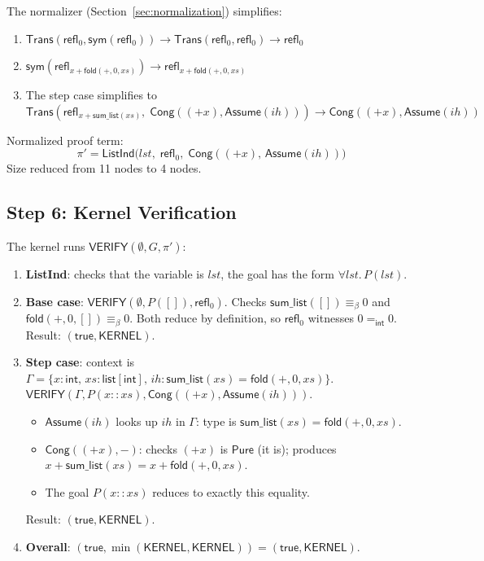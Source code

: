 \documentclass[11pt,a4paper]{report}
\theoremstyle{definition}
\theoremstyle{plain}
\newcommand{\Refl}{\mathsf{refl}}
\newcommand{\sym}{\mathsf{sym}}
\newcommand{\Assume}{\mathsf{Assume}}
\newcommand{\Trans}{\mathsf{Trans}}
\newcommand{\Cong}{\mathsf{Cong}}
\newcommand{\Pure}{\mathsf{Pure}}
\begin{document}
The normalizer (Section~\ref{sec:normalization}) simplifies:
\begin{enumerate}
  \item $\Trans(\Refl_0, \sym(\Refl_0)) \longrightarrow
         \Trans(\Refl_0, \Refl_0) \longrightarrow \Refl_0$
  \item $\sym(\Refl_{x + \mathsf{fold}(+,0,xs)}) \longrightarrow
         \Refl_{x + \mathsf{fold}(+,0,xs)}$
  \item The step case simplifies to
        $\Trans(\Refl_{x+\mathsf{sum\_list}(xs)},\;
         \Cong((+x), \Assume(\mathit{ih}))) \longrightarrow
         \Cong((+x), \Assume(\mathit{ih}))$
\end{enumerate}
Normalized proof term:
\[
  \pi' = \mathsf{ListInd}\bigl(\mathit{lst},\; \Refl_0,\;
    \Cong((+x),\, \Assume(\mathit{ih}))\bigr)
\]
Size reduced from 11 nodes to 4 nodes.

\subsection{Step 6: Kernel Verification}

The kernel runs $\mathsf{VERIFY}(\emptyset, G, \pi')$:
\begin{enumerate}
  \item \textbf{ListInd}: checks that the variable is $\mathit{lst}$,
    the goal has the form $\forall \mathit{lst}.\, P(\mathit{lst})$.
  \item \textbf{Base case}: $\mathsf{VERIFY}(\emptyset, P([]), \Refl_0)$.
    Checks $\mathsf{sum\_list}([]) \equiv_{\beta} 0$ and
    $\mathsf{fold}(+,0,[]) \equiv_{\beta} 0$. Both reduce by
    definition, so $\Refl_0$ witnesses $0 =_{\mathsf{int}} 0$.
    Result: $(\mathsf{true}, \mathsf{KERNEL})$.
  \item \textbf{Step case}: context is $\Gamma = \{x : \mathsf{int},\,
    xs : \mathsf{list}[\mathsf{int}],\, \mathit{ih} :
    \mathsf{sum\_list}(xs) = \mathsf{fold}(+,0,xs)\}$.
    $\mathsf{VERIFY}(\Gamma, P(x{::}xs),
    \Cong((+x), \Assume(\mathit{ih})))$.
    \begin{itemize}
      \item $\Assume(\mathit{ih})$ looks up $\mathit{ih}$ in $\Gamma$:
            type is $\mathsf{sum\_list}(xs) = \mathsf{fold}(+,0,xs)$.
      \item $\Cong((+x), -)$: checks $(+x)$ is $\Pure$ (it is);
            produces $x + \mathsf{sum\_list}(xs) = x + \mathsf{fold}(+,0,xs)$.
      \item The goal $P(x{::}xs)$ reduces to exactly this equality.
    \end{itemize}
    Result: $(\mathsf{true}, \mathsf{KERNEL})$.
  \item \textbf{Overall}: $(\mathsf{true}, \min(\mathsf{KERNEL}, \mathsf{KERNEL}))
    = (\mathsf{true}, \mathsf{KERNEL})$.
\end{enumerate}
\end{document}

